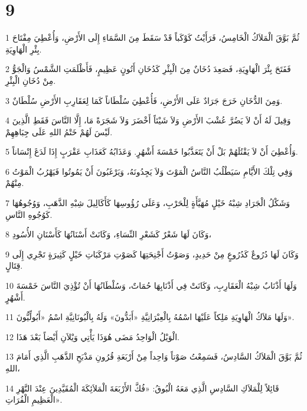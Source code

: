 \chapter{9}

\par 1 ثُمَّ بَوَّقَ الْمَلاَكُ الْخَامِسُ، فَرَأَيْتُ كَوْكَباً قَدْ سَقَطَ مِنَ السَّمَاءِ إِلَى الأَرْضِ، وَأُعْطِيَ مِفْتَاحَ بِئْرِ الْهَاوِيَةِ.
\par 2 فَفَتَحَ بِئْرَ الْهَاوِيَةِ، فَصَعِدَ دُخَانٌ مِنَ الْبِئْرِ كَدُخَانِ أَتُونٍ عَظِيمٍ، فَأَظْلَمَتِ الشَّمْسُ وَالْجَوُّ مِنْ دُخَانِ الْبِئْرِ.
\par 3 وَمِنَ الدُّخَانِ خَرَجَ جَرَادٌ عَلَى الأَرْضِ، فَأُعْطِيَ سُلْطَاناً كَمَا لِعَقَارِبِ الأَرْضِ سُلْطَانٌ.
\par 4 وَقِيلَ لَهُ أَنْ لاَ يَضُرَّ عُشْبَ الأَرْضِ وَلاَ شَيْئاً أَخْضَرَ وَلاَ شَجَرَةً مَا، إِلَّا النَّاسَ فَقَطِ الَّذِينَ لَيْسَ لَهُمْ خَتْمُ اللهِ عَلَى جِبَاهِهِمْ.
\par 5 وَأُعْطِيَ أَنْ لاَ يَقْتُلَهُمْ بَلْ أَنْ يَتَعَذَّبُوا خَمْسَةَ أَشْهُرٍ. وَعَذَابُهُ كَعَذَابِ عَقْرَبٍ إِذَا لَدَغَ إِنْسَاناً.
\par 6 وَفِي تِلْكَ الأَيَّامِ سَيَطْلُبُ النَّاسُ الْمَوْتَ وَلاَ يَجِدُونَهُ، وَيَرْغَبُونَ أَنْ يَمُوتُوا فَيَهْرُبُ الْمَوْتُ مِنْهُمْ.
\par 7 وَشَكْلُ الْجَرَادِ شِبْهُ خَيْلٍ مُهَيَّأَةٍ لِلْحَرْبِ، وَعَلَى رُؤُوسِهَا كَأَكَالِيلَ شِبْهِ الذَّهَبِ، وَوُجُوهُهَا كَوُجُوهِ النَّاسِ.
\par 8 وَكَانَ لَهَا شَعْرٌ كَشَعْرِ النِّسَاءِ، وَكَانَتْ أَسْنَانُهَا كَأَسْنَانِ الأُسُودِ،
\par 9 وَكَانَ لَهَا دُرُوعٌ كَدُرُوعٍ مِنْ حَدِيدٍ، وَصَوْتُ أَجْنِحَتِهَا كَصَوْتِ مَرْكَبَاتِ خَيْلٍ كَثِيرَةٍ تَجْرِي إِلَى قِتَالٍ.
\par 10 وَلَهَا أَذْنَابٌ شِبْهُ الْعَقَارِبِ، وَكَانَتْ فِي أَذْنَابِهَا حُمَاتٌ، وَسُلْطَانُهَا أَنْ تُؤْذِيَ النَّاسَ خَمْسَةَ أَشْهُرٍ.
\par 11 وَلَهَا مَلاَكُ الْهَاوِيَةِ مَلِكاً عَلَيْهَا اسْمُهُ بِالْعِبْرَانِيَّةِ «أَبَدُّونَ» وَلَهُ بِالْيُونَانِيَّةِ اسْمُ «أَبُولِّيُّونَ».
\par 12 الْوَيْلُ الْوَاحِدُ مَضَى هُوَذَا يَأْتِي وَيْلاَنِ أَيْضاً بَعْدَ هَذَا.
\par 13 ثُمَّ بَوَّقَ الْمَلاَكُ السَّادِسُ، فَسَمِعْتُ صَوْتاً وَاحِداً مِنْ أَرْبَعَةِ قُرُونِ مَذْبَحِ الذَّهَبِ الَّذِي أَمَامَ اللهِ،
\par 14 قَائِلاً لِلْمَلاَكِ السَّادِسِ الَّذِي مَعَهُ الْبُوقُ: «فُكَّ الأَرْبَعَةَ الْمَلاَئِكَةَ الْمُقَيَّدِينَ عِنْدَ النَّهْرِ الْعَظِيمِ الْفُرَاتِ».
